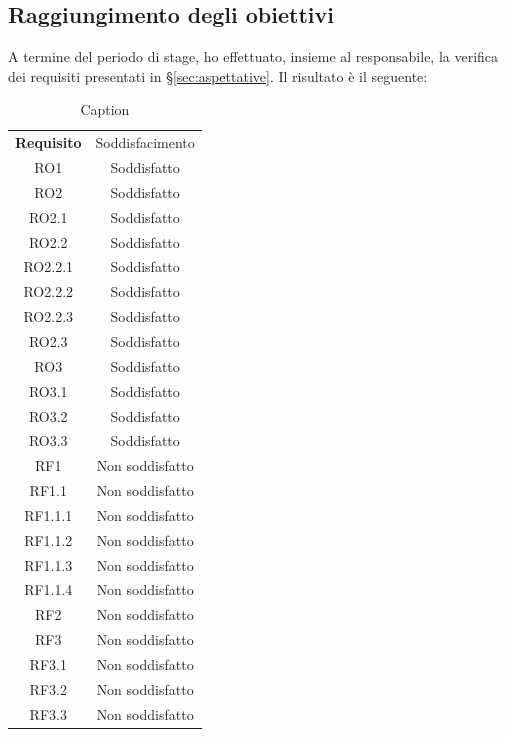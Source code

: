 \subsection{Raggiungimento degli obiettivi}
A termine del periodo di stage, ho effettuato, insieme al responsabile, la verifica dei requisiti presentati in \S\ref{sec:aspettative}. Il risultato è il seguente:
\begin{table}[H]
    \centering
    \begin{tabular}{|c|c|}
    \hline
        \textbf{Requisito} & {Soddisfacimento} \\
        \rowcolor{green!15} RO1 & Soddisfatto \\ \hline
        \rowcolor{green!15} RO2 & Soddisfatto \\  \hline
        \rowcolor{green!15} RO2.1 & Soddisfatto \\  \hline
        \rowcolor{green!15} RO2.2 & Soddisfatto \\  \hline
        \rowcolor{green!15} RO2.2.1 & Soddisfatto \\  \hline
        \rowcolor{green!15} RO2.2.2 & Soddisfatto \\  \hline
        \rowcolor{green!15} RO2.2.3 & Soddisfatto \\  \hline
        \rowcolor{green!15} RO2.3 & Soddisfatto \\  \hline
        \rowcolor{green!15} RO3 & Soddisfatto \\  \hline
        \rowcolor{green!15} RO3.1 & Soddisfatto \\  \hline
        \rowcolor{green!15} RO3.2 & Soddisfatto \\  \hline
        \rowcolor{green!15} RO3.3 & Soddisfatto \\  \hline
        \rowcolor{red!15} RF1 & Non soddisfatto \\ \hline
        \rowcolor{red!15} RF1.1 & Non soddisfatto \\ \hline
        \rowcolor{red!15} RF1.1.1 & Non soddisfatto \\ \hline
        \rowcolor{red!15} RF1.1.2 & Non soddisfatto \\ \hline
        \rowcolor{red!15} RF1.1.3 & Non soddisfatto \\ \hline
        \rowcolor{red!15} RF1.1.4 & Non soddisfatto \\ \hline
        \rowcolor{red!15} RF2 & Non soddisfatto \\ \hline
        \rowcolor{red!15} RF3 & Non soddisfatto \\ \hline
        \rowcolor{red!15} RF3.1 & Non soddisfatto \\ \hline
        \rowcolor{red!15} RF3.2 & Non soddisfatto \\ \hline
        \rowcolor{red!15} RF3.3 & Non soddisfatto \\ \hline
    \end{tabular}
    \caption{Caption}
    \label{tab:my_label}
\end{table}

